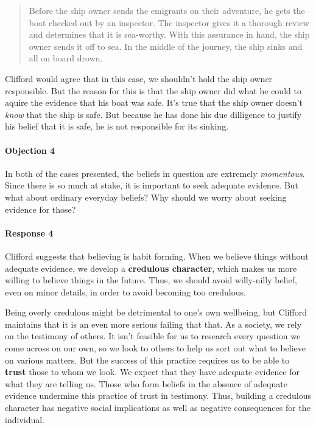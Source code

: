 \documentclass[letterpaper,10pt]{article}
\begin{document}
\begin{quote}
 Before the ship owner sends the emigrants on their adventure, he gets the boat checked out by an inspector. The inspector gives it a thorough review and determines that it is sea-worthy.  With this assurance in hand, the ship owner sends it off to sea. In the middle of the journey, the ship sinks and all on board drown.
\end{quote}

Clifford would agree that in this case, we shouldn't hold the ship owner responsible.  But the reason for this is that the ship owner did what he could to aquire the evidence that his boat was safe. It's true that the ship owner doesn't \textit{know} that the ship is safe. But because he has done his due dilligence to justify his belief that it is safe, he is not responsible for its sinking.

\paragraph{Objection 4} In both of the cases presented, the beliefs in question are extremely \textit{momentous}.  Since there is so much at stake, it is important to seek adequate evidence.  But what about ordinary everyday beliefs? Why should we worry about seeking evidence for those?

\paragraph{Response 4} Clifford suggests that believing is habit forming. When we believe things without adequate evidence, we develop a \textbf{credulous character}, which makes us more willing to believe things in the future. Thus, we should avoid willy-nilly belief, even on minor details, in order to avoid becoming too credulous.

Being overly credulous might be detrimental to one's own wellbeing, but Clifford maintains that it is an even more serious failing that that. As a society, we rely on the testimony of others.  It isn't feasible for us to research every question we come across on our own, so we look to others to help us sort out what to believe on various matters. But the success of this practice requires us to be able to \textbf{trust} those to whom we look. We expect that they have adequate evidence for what they are telling us.  Those who form beliefs in the absence of adequate evidence undermine this practice of trust in testimony. Thus, building a credulous character has negative social implications as well as negative consequences for the individual.
\end{document}

